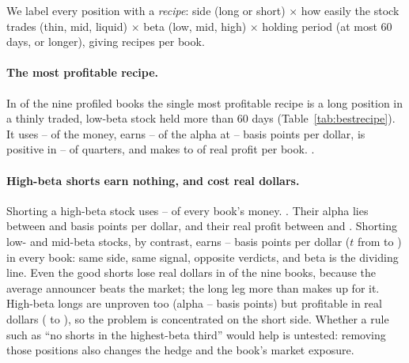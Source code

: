 \documentclass[11pt]{article}
\theoremstyle{definition}
\newcommand{\1}{\mathbf{1}}
\begin{document}
We label every position with a \emph{recipe}: side (long or short) $\times$ how easily the stock trades (thin, mid, liquid) $\times$ beta (low, mid, high) $\times$ holding period
(at most 60 days, or longer), giving  recipes per book.

\paragraph{The most profitable recipe.} In  of the nine profiled books the single most profitable recipe is a long position in a thinly traded, low-beta stock held more than 60 days
(Table~\ref{tab:bestrecipe}). It uses -- of the money, earns -- of the alpha at -- basis points per dollar, is
positive in -- of quarters, and makes  to  of real profit per book. .

\begin{table}[t]\centering
\caption{The recipe ``long, thin, low-beta, held over 60 days'' in each book (size-matched alpha). ``Eras +'' is the number of the three eras in which its alpha is positive; ``Top recipe''
says whether it is the book's most profitable recipe. Source: \texttt{results/profiles\_recipes.csv}.}\label{tab:bestrecipe}

\end{table}

\paragraph{High-beta shorts earn nothing, and cost real dollars.} Shorting a high-beta stock uses -- of every book's money. .
Their alpha lies between  and  basis points per dollar, and their real profit between  and . Shorting low- and mid-beta stocks, by contrast, earns
-- basis points per dollar ($t$ from  to ) in every book: same side, same signal, opposite verdicts, and beta is the dividing line. Even the good shorts lose real
dollars in  of the nine books, because the average announcer beats the market; the long leg more than makes up for it. High-beta longs are unproven too (alpha -- basis
points) but profitable in real dollars ( to ), so the problem is concentrated on the short side. Whether a rule such as ``no shorts in the highest-beta third'' would help is untested: removing those
positions also changes the hedge and the book's market exposure.
\end{document}

